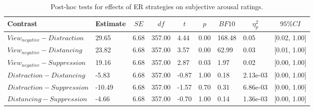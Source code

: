 \documentclass[
  man,floatsintext]{apa6}
\begin{document}
\begin{table}[H]

\begin{center}
\begin{threeparttable}

\caption{\label{tab:SupplEffectER}Post-hoc tests for effects of ER strategies on subjective arousal ratings.}

\begin{tabular}{lllllllll}
\toprule
Contrast & \multicolumn{1}{c}{Estimate} & \multicolumn{1}{c}{$SE$} & \multicolumn{1}{c}{$df$} & \multicolumn{1}{c}{$t$} & \multicolumn{1}{c}{$p$} & \multicolumn{1}{c}{$BF10$} & \multicolumn{1}{c}{$\eta_{p}^{2}$} & \multicolumn{1}{c}{$95\% CI$}\\
\midrule
$View_{negative} - Distraction$ & 29.65 & 6.68 & 357.00 & 4.44 & 0.00 & 168.48 & 0.05 & {}[0.02, 1.00]\\
$View_{negative} - Distancing$ & 23.82 & 6.68 & 357.00 & 3.57 & 0.00 & 62.99 & 0.03 & {}[0.01, 1.00]\\
$View_{negative} - Suppression$ & 19.16 & 6.68 & 357.00 & 2.87 & 0.03 & 1.97 & 0.02 & {}[0.00, 1.00]\\
$Distraction - Distancing$ & -5.83 & 6.68 & 357.00 & -0.87 & 1.00 & 0.18 & 2.13e-03 & {}[0.00, 1.00]\\
$Distraction - Suppression$ & -10.49 & 6.68 & 357.00 & -1.57 & 0.70 & 0.31 & 6.86e-03 & {}[0.00, 1.00]\\
$Distancing - Suppression$ & -4.66 & 6.68 & 357.00 & -0.70 & 1.00 & 0.14 & 1.36e-03 & {}[0.00, 1.00]\\
\bottomrule
\end{tabular}

\end{threeparttable}
\end{center}

\end{table}
\end{document}

